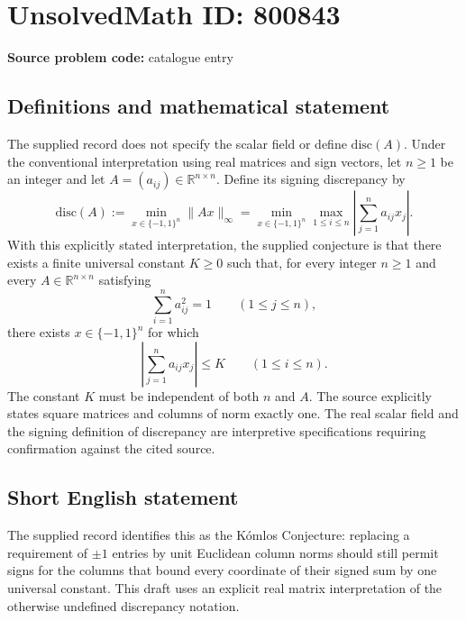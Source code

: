 \documentclass[11pt]{article}
\newcommand{\R}{\mathbb{R}}
\begin{document}
\section*{UnsolvedMath ID: 800843}
\textbf{Source problem code:} catalogue entry
\subsection{Definitions and mathematical statement}
The supplied record does not specify the scalar field or define \(\mathrm{disc}(A)\). Under the conventional interpretation using real matrices and sign vectors, let \(n\geq 1\) be an integer and let \(A=(a_{ij})\in\R^{n\times n}\). Define its signing discrepancy by
\[
\mathrm{disc}(A):=\min_{x\in\{-1,1\}^{n}}\|Ax\|_{\infty}
=\min_{x\in\{-1,1\}^{n}}\max_{1\leq i\leq n}\left|\sum_{j=1}^{n}a_{ij}x_j\right|.
\]
With this explicitly stated interpretation, the supplied conjecture is that there exists a finite universal constant \(K\geq 0\) such that, for every integer \(n\geq 1\) and every \(A\in\R^{n\times n}\) satisfying
\[
\sum_{i=1}^{n}a_{ij}^{2}=1\qquad(1\leq j\leq n),
\]
there exists \(x\in\{-1,1\}^{n}\) for which
\[
\left|\sum_{j=1}^{n}a_{ij}x_j\right|\leq K\qquad(1\leq i\leq n).
\]
The constant \(K\) must be independent of both \(n\) and \(A\). The source explicitly states square matrices and columns of norm exactly one. The real scalar field and the signing definition of discrepancy are interpretive specifications requiring confirmation against the cited source.
\subsection{Short English statement}
The supplied record identifies this as the K\'{o}mlos Conjecture: replacing a requirement of \(\pm1\) entries by unit Euclidean column norms should still permit signs for the columns that bound every coordinate of their signed sum by one universal constant. This draft uses an explicit real matrix interpretation of the otherwise undefined discrepancy notation.
\end{document}
